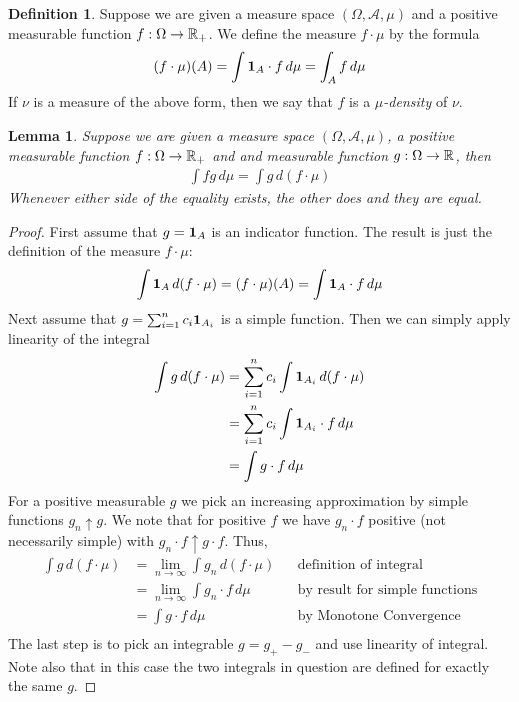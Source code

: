 \documentclass{amsart}
\newtheorem{lem}[thm]{Lemma}
\theoremstyle{remark}
\theoremstyle{definition}
\newtheorem{defn}[thm]{Definition}
\begin{document}
\begin{defn}Suppose we are given a measure space $(\Omega, \mathcal{A},
  \mu)$ and a positive measurable function $f : \Omega \to \mathbb{R}_+$.
  We define the measure $f \cdot \mu$ by the formula
\begin{align*}
(f \cdot \mu)(A) = \int \textbf{1}_{A} \cdot f \, d \mu = \int_A f
\, d\mu
\end{align*}
If $\nu$ is a measure of the above form, then we say that $f$ is a
$\mu$\emph{-density} of $\nu$.
\end{defn}
\begin{lem}\label{ChainRuleDensity}Suppose we are given a measure space $(\Omega, \mathcal{A},
  \mu)$, a positive measurable function $f : \Omega \to \mathbb{R}_+$ and
  and measurable function $g : \Omega \to \mathbb{R}$, then 
\begin{align*}
\int f g \, d \mu = \int g \, d (f \cdot \mu)
\end{align*}
Whenever either side of the equality exists, the other does and they
are equal.
\end{lem}
\begin{proof}First assume that $g=\textbf{1}_{A}$ is an indicator
  function.  The result is just the definition of the measure $f \cdot
  \mu$:
\begin{align*}
\int \textbf{1}_{A} \, d(f \cdot \mu) = (f \cdot \mu)(A) = \int \textbf{1}_{A}
\cdot f \, d\mu
\end{align*}
Next assume that $g = \sum_{i=1}^n c_i \textbf{1}_{A_i}$ is a
simple function.  Then we can simply apply linearity of the integral
\begin{align*}
\int g \, d(f \cdot \mu) &=\sum_{i=1}^n c_i \int \textbf{1}_{A_i}
\, d(f \cdot \mu)\\
 &=\sum_{i=1}^n c_i \int \textbf{1}_{A_i}\cdot f
\, d\mu  \\
 &=\int g\cdot f
\, d\mu  \\
\end{align*}
For a positive measurable $g$ we pick an increasing approximation by simple
functions $g_n \uparrow g$.  We note that for positive $f$ we have 
 $g_n \cdot f$ positive (not necessarily simple) with $g_n \cdot f \uparrow g \cdot f$.  Thus,
\begin{align*}
\int g \, d(f \cdot \mu) &= \lim_{n \to \infty} \int g_n \, d(f \cdot
\mu) & &\text{definition of integral}\\
&= \lim_{n \to \infty} \int g_n \cdot f \, d \mu & &\text{by result for
  simple functions}\\
&= \int g \cdot f \, d \mu & &\text{by Monotone Convergence}\\
\end{align*}
The last step is to pick an integrable $g = g_+ - g_-$ and use
linearity of integral.  Note also that in this case the two integrals
in question are defined for exactly the same $g$.
\end{proof}
\end{document}
